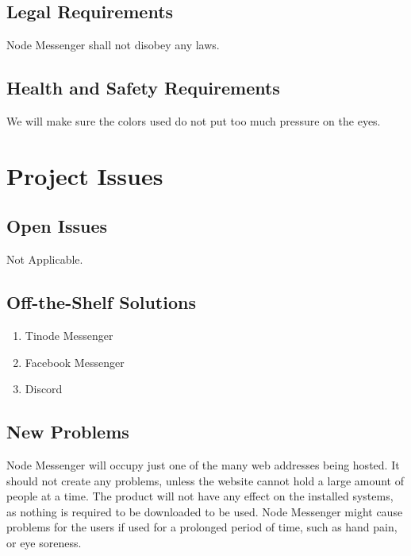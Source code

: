 \documentclass[12pt, titlepage]{article}
\begin{document}
	    \subsection{Legal Requirements}
		Node Messenger shall not disobey any laws.
    	\subsection{Health and Safety Requirements}
		We will make sure the colors used do not put too much pressure on the eyes. 
	
	\newpage
    \section{Project Issues}

    	\subsection{Open Issues}
    	Not Applicable.

    	\subsection{Off-the-Shelf Solutions}
    	\begin{enumerate}
    	    \item Tinode Messenger
    	    \item Facebook Messenger
    	    \item Discord
    	\end{enumerate}

    	\subsection{New Problems}
    	Node Messenger will occupy just one of the many web addresses being hosted. It should not create any problems, unless the website cannot hold a large amount of people at a time. The product will not have any effect on the installed systems, as nothing is required to be downloaded to be used. Node Messenger might cause problems for the users if used for a prolonged period of time, such as hand pain, or eye soreness. 
\end{document}

